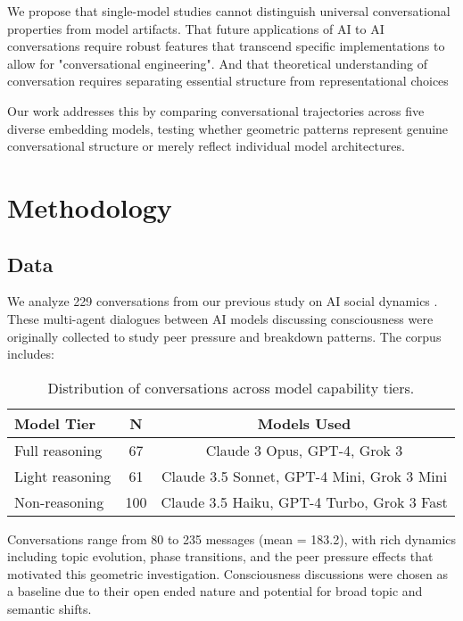 \documentclass[11pt,letterpaper]{article}
\newcommand{\totalConversations}{229}
\newcommand{\minConvLength}{80}
\newcommand{\maxConvLength}{235}
\newcommand{\meanConvLength}{183.2}
\begin{document}
We propose that single-model studies cannot distinguish universal conversational properties from model artifacts. That future applications of AI to AI conversations require robust features that transcend specific implementations to allow for "conversational engineering". And that theoretical understanding of conversation requires separating essential structure from representational choices

Our work addresses this by comparing conversational trajectories across five diverse embedding models, testing whether geometric patterns represent genuine conversational structure or merely reflect individual model architectures.

\section{Methodology}

\subsection{Data}

We analyze \totalConversations{} conversations from our previous study on AI social dynamics \citep{garcia2025peer}. These multi-agent dialogues between AI models discussing consciousness were originally collected to study peer pressure and breakdown patterns. The corpus includes:

\begin{table}[h]
\centering
\begin{tabular}{lcc}
\toprule
Model Tier & N & Models Used \\
\midrule
Full reasoning & 67 & Claude 3 Opus, GPT-4, Grok 3 \\
Light reasoning & 61 & Claude 3.5 Sonnet, GPT-4 Mini, Grok 3 Mini \\
Non-reasoning & 100 & Claude 3.5 Haiku, GPT-4 Turbo, Grok 3 Fast \\
\bottomrule
\end{tabular}
\caption{Distribution of conversations across model capability tiers.}
\label{tab:model_tiers}
\end{table}

Conversations range from \minConvLength{} to \maxConvLength{} messages (mean = \meanConvLength{}), with rich dynamics including topic evolution, phase transitions, and the peer pressure effects that motivated this geometric investigation. Consciousness discussions were chosen as a baseline due to their open ended nature and potential for broad topic and semantic shifts. 
\end{document}
